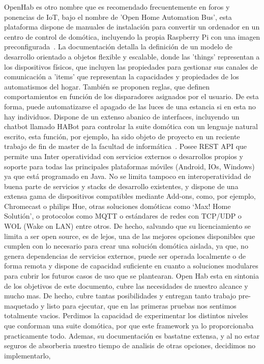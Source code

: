 OpenHab es otro nombre que es recomendado frecuentemente en foros y ponencias de IoT, bajo el nombre de 'Open Home Automation Bus', esta plataforma dispone de manuales de instalación para convertir un ordenador en un centro de control de domótica, incluyendo la propia Raspberry Pi con una imagen preconfigurada~\cite{openHabRaspberryPi}. La documentación detalla la definición de un modelo de desarrollo orientado a objetos flexible y escalable, donde las 'things' representan a los dispositivos físicos, que incluyen las propiedades para gestionar sus canales de comunicación a 'items' que representan la capacidades y propiedades de los automatismos del hogar. También se proponen reglas, que definen comportamientos en función de los disparadores asignados por el usuario. De esta forma, puede automatizarse el apagado de las luces de una estancia si en esta no hay individuos. Dispone de un extenso abanico de interfaces, incluyendo un chatbot llamado HABot para controlar la suite domótica con un lenguaje natural escrito, esta función, por ejemplo, ha sido objeto de proyecto en un reciente trabajo de fin de master de la facultad de informática~\cite{eprint49443}. Posee REST API que permite una Inter operatividad con servicios externos o desarrollos propios y soporte para todas las principales plataformas móviles (Android, IOs, Windows) ya que está programado en Java. No se limita tampoco en interoperatividad de buena parte de servicios y stacks de desarrollo existentes, y dispone de una extensa gama de dispositivos compatibles mediante Add-ons, como, por ejemplo, Chromecast o philips Hue, otras soluciones domóticas como ‘Max! Home Solutión’, o protocolos como MQTT o estándares de redes con TCP/UDP o WOL (Wake on LAN) entre otros. De hecho, salvando que su licenciamiento se limita a ser open source, es de lejos, una de las mejores opciones disponibles que cumplen con lo necesario para crear una solución domótica aislada, ya que, no genera dependencias de servicios externos, puede ser operada localmente o de forma remota y dispone de capacidad suficiente en cuanto a soluciones modulares para cubrir los futuros casos de uso que se plantearan. Open Hab esta en sintonia de los objetivos de este documento, cubre las necesidades de nuestro alcance y mucho mas. De hecho, cubre tantas posibilidades y entregan tanto trabajo pre-maquetado y listo para ejecutar, que en las primeras pruebas nos sentimos totalmente vacios. Perdimos la capacidad de experimentar los distintos niveles que conforman una suite domótica, por que este framework ya lo proporcionaba practicamente todo. Ademas, su documentación es bastatne extensa, y al no estar seguros de absorberia nuestro tiempo de analisis de otras opciones, decidimos no implementarlo,

